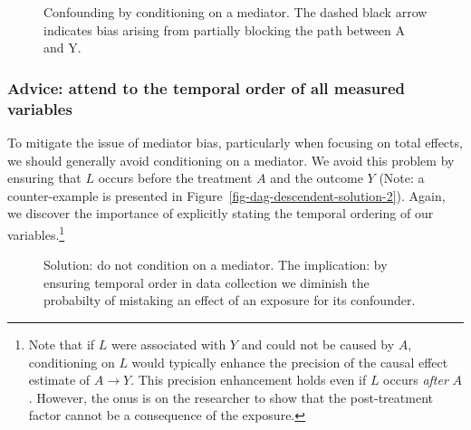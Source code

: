 \documentclass[
  singlecolumn,
  9pt]{article}
\begin{document}
\begin{figure}


\caption{\label{fig-dag-mediator}Confounding by conditioning on a
mediator. The dashed black arrow indicates bias arising from partially
blocking the path between A and Y.}

\end{figure}%

\subsubsection{Advice: attend to the temporal order of all measured
variables}\label{advice-attend-to-the-temporal-order-of-all-measured-variables-2}

To mitigate the issue of mediator bias, particularly when focusing on
total effects, we should generally avoid conditioning on a mediator. We
avoid this problem by ensuring that \(L\) occurs before the treatment
\(A\) and the outcome \(Y\) (Note: a counter-example is presented in
Figure~\ref{fig-dag-descendent-solution-2}). Again, we discover the
importance of explicitly stating the temporal ordering of our
variables.\footnote{Note that if \(L\) were associated with \(Y\) and
  could not be caused by \(A\), conditioning on \(L\) would typically
  enhance the precision of the causal effect estimate of \(A \to Y\).
  This precision enhancement holds even if \(L\) occurs \emph{after}
  \(A\). However, the onus is on the researcher to show that the
  post-treatment factor cannot be a consequence of the exposure.}

\begin{figure}


\caption{\label{fig-dag-mediator-solution}Solution: do not condition on
a mediator. The implication: by ensuring temporal order in data
collection we diminish the probabilty of mistaking an effect of an
exposure for its confounder.}

\end{figure}%
\end{document}
